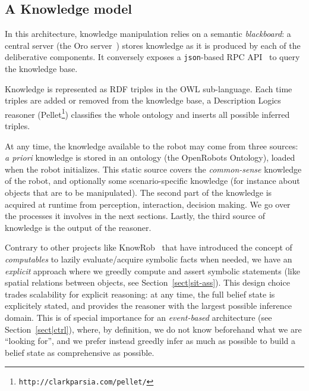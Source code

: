 \documentclass[preprint,3p,times]{elsarticle}
\begin{document}
\subsection{A Knowledge model}

In this architecture, knowledge manipulation relies on a
semantic \emph{blackboard}: a central server (the {\sc Oro}
server~\cite{Lemaignan2010}) stores knowledge as it is produced by each of the
deliberative components. It conversely exposes a {\tt json}-based RPC
API~\cite{lemaignan2012kbapi} to query the knowledge base.

Knowledge is represented as RDF triples in the OWL sub-language. Each
time triples are added or removed from the knowledge base, a Description
Logics reasoner ({\sc Pellet}\footnote{\tt http://clarkparsia.com/pellet/})
classifies the whole ontology and inserts all possible inferred triples.

At any time, the knowledge available to the robot may come from three sources:
{\it a priori} knowledge is stored in an ontology (the {\sc OpenRobots Ontology}),
loaded when the robot initializes. This static source covers the
\emph{common-sense} knowledge of the robot, and optionally some
scenario-specific knowledge (for instance about objects that are to be
manipulated). The second part of the knowledge is acquired at runtime from
perception, interaction, decision making.  We go over the processes it involves
in the next sections. Lastly, the third source of knowledge is the output of the
reasoner.

Contrary to other projects like KnowRob~\cite{Tenorth2009a} that have introduced
the concept of \emph{computables} to lazily evaluate/acquire symbolic facts when
needed, we have an \emph{explicit} approach where we greedly compute and assert
symbolic statements (like spatial relations between objects, see
Section~\ref{sect|sit-ass}). This design choice trades scalability for explicit
reasoning: at any time, the full belief state is explicitely stated, and
provides the reasoner with the largest possible inference domain. This is of
special importance for an \emph{event-based} architecture (see
Section~\ref{sect|ctrl}), where, by definition, we do not know beforehand what
we are ``looking for'', and we prefer instead greedly infer as much as possible
to build a belief state as comprehensive as possible.
\end{document}
